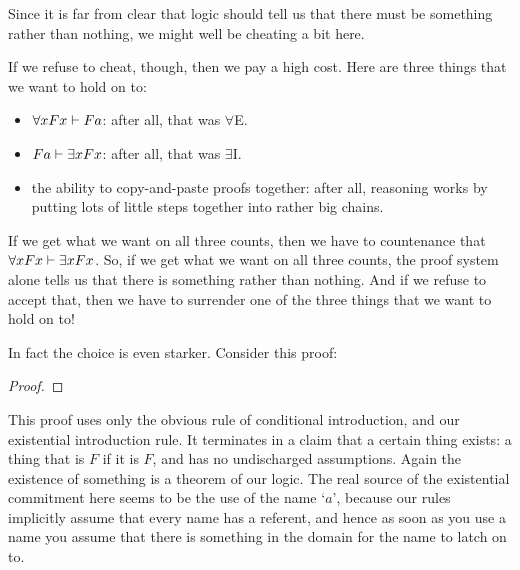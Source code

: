 Since it is far from clear that logic should tell us that there must be something rather than nothing, we might well be cheating a bit here. 

If we refuse to cheat, though, then we pay a high cost. Here are three things that we want to hold on to:
	\begin{itemize}
		\item $\forall x Fx \vdash Fa$: after all, that was $\forall$E.
		\item $Fa \vdash \exists x Fx$: after all, that was $\exists$I.
		\item the ability to copy-and-paste proofs together: after all, reasoning works by putting lots of little steps together into rather big chains.
	\end{itemize}
If we get what we want on all three counts, then we have to countenance that $\forall xFx \vdash \exists x Fx$. So, if we get what we want on all three counts, the proof system alone tells us that there is something rather than nothing. And if we refuse to accept that, then we have to surrender one of the three things that we want to hold on to!

In fact the choice is even starker. Consider this proof: \begin{proof}
	\open
	\close
\end{proof} This proof uses only the obvious rule of conditional introduction, and our existential introduction rule. It terminates in a claim that a certain thing exists: a thing that is $F$ if it is $F$, and has no undischarged assumptions. Again the existence of something is a theorem of our logic. The real source of the existential commitment here seems to be the use of the name `$a$', because our rules implicitly assume that every name has a referent, and hence as soon as you use a name you assume that there is something in the domain for the name to latch on to.

